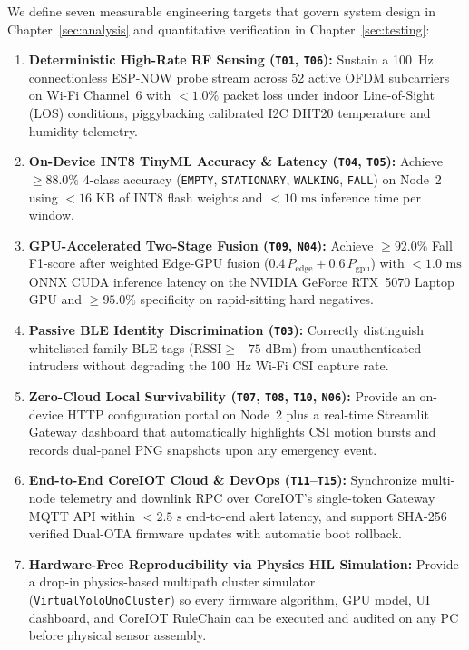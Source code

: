 \documentclass{hcmut-report}
\begin{document}
We define seven measurable engineering targets that govern system design in Chapter~\ref{sec:analysis} and quantitative verification in Chapter~\ref{sec:testing}:
\begin{enumerate}
  \item \textbf{Deterministic High-Rate RF Sensing (\texttt{T01}, \texttt{T06}):} Sustain a 100~Hz connectionless ESP-NOW probe stream across 52 active OFDM subcarriers on Wi-Fi Channel~6 with $<1.0\%$ packet loss under indoor Line-of-Sight (LOS) conditions, piggybacking calibrated I2C DHT20 temperature and humidity telemetry.
  \item \textbf{On-Device INT8 TinyML Accuracy \& Latency (\texttt{T04}, \texttt{T05}):} Achieve $\ge 88.0\%$ 4-class accuracy (\texttt{EMPTY}, \texttt{STATIONARY}, \texttt{WALKING}, \texttt{FALL}) on Node~2 using $<16\text{ KB}$ of INT8 flash weights and $<10\text{ ms}$ inference time per window.
  \item \textbf{GPU-Accelerated Two-Stage Fusion (\texttt{T09}, \texttt{N04}):} Achieve $\ge 92.0\%$ Fall F1-score after weighted Edge-GPU fusion ($0.4\,P_{\text{edge}} + 0.6\,P_{\text{gpu}}$) with $<1.0\text{ ms}$ ONNX CUDA inference latency on the NVIDIA GeForce RTX~5070 Laptop GPU and $\ge 95.0\%$ specificity on rapid-sitting hard negatives.
  \item \textbf{Passive BLE Identity Discrimination (\texttt{T03}):} Correctly distinguish whitelisted family BLE tags ($\text{RSSI} \ge -75\text{ dBm}$) from unauthenticated intruders without degrading the 100~Hz Wi-Fi CSI capture rate.
  \item \textbf{Zero-Cloud Local Survivability (\texttt{T07}, \texttt{T08}, \texttt{T10}, \texttt{N06}):} Provide an on-device HTTP configuration portal on Node~2 plus a real-time Streamlit Gateway dashboard that automatically highlights CSI motion bursts and records dual-panel PNG snapshots upon any emergency event.
  \item \textbf{End-to-End CoreIOT Cloud \& DevOps (\texttt{T11}--\texttt{T15}):} Synchronize multi-node telemetry and downlink RPC over CoreIOT's single-token Gateway MQTT API within $<2.5\text{ s}$ end-to-end alert latency, and support SHA-256 verified Dual-OTA firmware updates with automatic boot rollback.
  \item \textbf{Hardware-Free Reproducibility via Physics HIL Simulation:} Provide a drop-in physics-based multipath cluster simulator (\texttt{VirtualYoloUnoCluster}) so every firmware algorithm, GPU model, UI dashboard, and CoreIOT RuleChain can be executed and audited on any PC before physical sensor assembly.
\end{enumerate}
\end{document}
